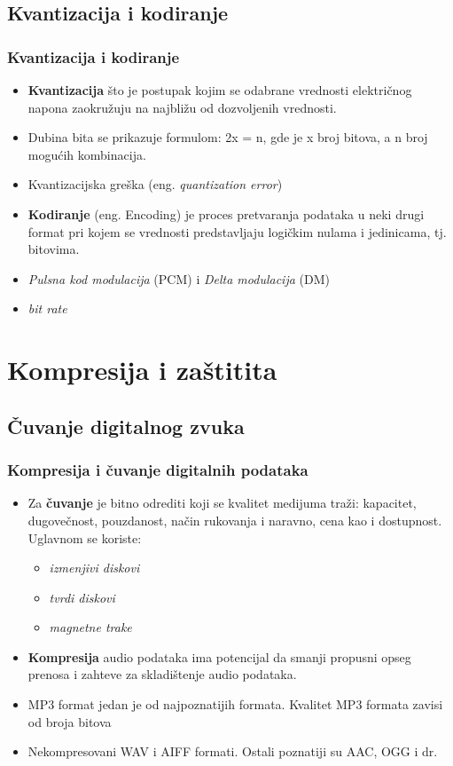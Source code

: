 \documentclass{beamer}
\begin{document}
\subsection{Kvantizacija i kodiranje}
\begin{frame}[fragile]\frametitle{Kvantizacija i kodiranje}
	\begin{itemize}	
		\item \textbf{Kvantizacija} što je postupak kojim se odabrane vrednosti električnog napona zaokružuju na najbližu od dozvoljenih vrednosti.
		\item Dubina bita se prikazuje formulom: 2x = n, gde je x broj bitova, a n broj mogućih kombinacija.
		\item Kvantizacijska greška (eng. \textit{quantization error})
		\item \textbf{Kodiranje} (eng. Encoding) je proces pretvaranja podataka u neki drugi format pri kojem se vrednosti predstavljaju logičkim nulama i jedinicama, tj. bitovima. 
		\item \textit{Pulsna kod modulacija} (PCM) i \textit{Delta modulacija} (DM)
		\item \textit{bit rate}
	\end{itemize}
\end{frame}

\section{Kompresija i zaštitita}
\subsection{Čuvanje digitalnog zvuka}
\begin{frame}[fragile]\frametitle{Kompresija i čuvanje digitalnih podataka}
\begin{itemize}
  \item Za \textbf{čuvanje} je bitno odrediti koji se kvalitet medijuma traži: kapacitet, dugovečnost, pouzdanost, način rukovanja i naravno, cena kao i dostupnost. Uglavnom se koriste:
    \begin{itemize}
	 \item \textit{izmenjivi diskovi}
	 \item \textit{tvrdi diskovi}
	 \item \textit{magnetne trake}
    \end{itemize}
  \item \textbf{Kompresija} audio podataka ima potencijal da smanji propusni opseg prenosa i zahteve za skladištenje audio podataka.
  \item MP3 format jedan je od najpoznatijih formata. Kvalitet MP3 formata zavisi od broja bitova
  \item Nekompresovani WAV i AIFF formati. Ostali poznatiji su AAC, OGG i dr.
\end{itemize}
\end{frame}
\end{document}
